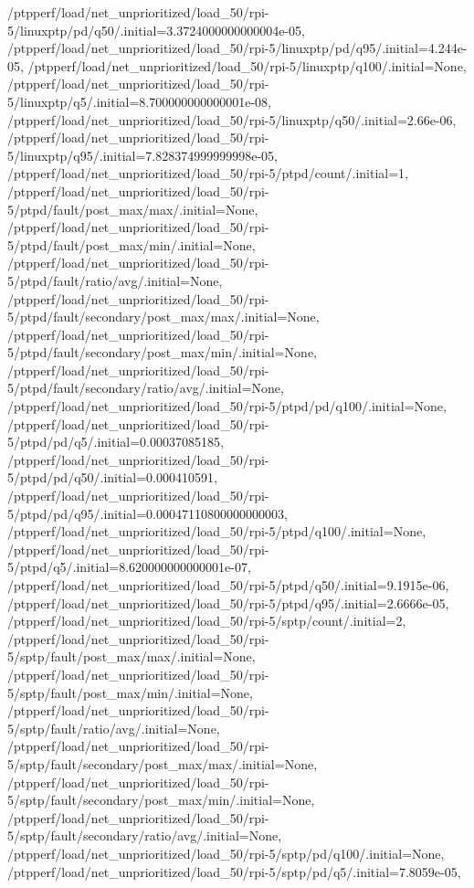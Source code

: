 {    /ptpperf/load/net_unprioritized/load_50/rpi-5/linuxptp/pd/q50/.initial=3.3724000000000004e-05,
    /ptpperf/load/net_unprioritized/load_50/rpi-5/linuxptp/pd/q95/.initial=4.244e-05,
    /ptpperf/load/net_unprioritized/load_50/rpi-5/linuxptp/q100/.initial=None,
    /ptpperf/load/net_unprioritized/load_50/rpi-5/linuxptp/q5/.initial=8.700000000000001e-08,
    /ptpperf/load/net_unprioritized/load_50/rpi-5/linuxptp/q50/.initial=2.66e-06,
    /ptpperf/load/net_unprioritized/load_50/rpi-5/linuxptp/q95/.initial=7.828374999999998e-05,
    /ptpperf/load/net_unprioritized/load_50/rpi-5/ptpd/count/.initial=1,
    /ptpperf/load/net_unprioritized/load_50/rpi-5/ptpd/fault/post_max/max/.initial=None,
    /ptpperf/load/net_unprioritized/load_50/rpi-5/ptpd/fault/post_max/min/.initial=None,
    /ptpperf/load/net_unprioritized/load_50/rpi-5/ptpd/fault/ratio/avg/.initial=None,
    /ptpperf/load/net_unprioritized/load_50/rpi-5/ptpd/fault/secondary/post_max/max/.initial=None,
    /ptpperf/load/net_unprioritized/load_50/rpi-5/ptpd/fault/secondary/post_max/min/.initial=None,
    /ptpperf/load/net_unprioritized/load_50/rpi-5/ptpd/fault/secondary/ratio/avg/.initial=None,
    /ptpperf/load/net_unprioritized/load_50/rpi-5/ptpd/pd/q100/.initial=None,
    /ptpperf/load/net_unprioritized/load_50/rpi-5/ptpd/pd/q5/.initial=0.00037085185,
    /ptpperf/load/net_unprioritized/load_50/rpi-5/ptpd/pd/q50/.initial=0.000410591,
    /ptpperf/load/net_unprioritized/load_50/rpi-5/ptpd/pd/q95/.initial=0.00047110800000000003,
    /ptpperf/load/net_unprioritized/load_50/rpi-5/ptpd/q100/.initial=None,
    /ptpperf/load/net_unprioritized/load_50/rpi-5/ptpd/q5/.initial=8.620000000000001e-07,
    /ptpperf/load/net_unprioritized/load_50/rpi-5/ptpd/q50/.initial=9.1915e-06,
    /ptpperf/load/net_unprioritized/load_50/rpi-5/ptpd/q95/.initial=2.6666e-05,
    /ptpperf/load/net_unprioritized/load_50/rpi-5/sptp/count/.initial=2,
    /ptpperf/load/net_unprioritized/load_50/rpi-5/sptp/fault/post_max/max/.initial=None,
    /ptpperf/load/net_unprioritized/load_50/rpi-5/sptp/fault/post_max/min/.initial=None,
    /ptpperf/load/net_unprioritized/load_50/rpi-5/sptp/fault/ratio/avg/.initial=None,
    /ptpperf/load/net_unprioritized/load_50/rpi-5/sptp/fault/secondary/post_max/max/.initial=None,
    /ptpperf/load/net_unprioritized/load_50/rpi-5/sptp/fault/secondary/post_max/min/.initial=None,
    /ptpperf/load/net_unprioritized/load_50/rpi-5/sptp/fault/secondary/ratio/avg/.initial=None,
    /ptpperf/load/net_unprioritized/load_50/rpi-5/sptp/pd/q100/.initial=None,
    /ptpperf/load/net_unprioritized/load_50/rpi-5/sptp/pd/q5/.initial=7.8059e-05,
}
